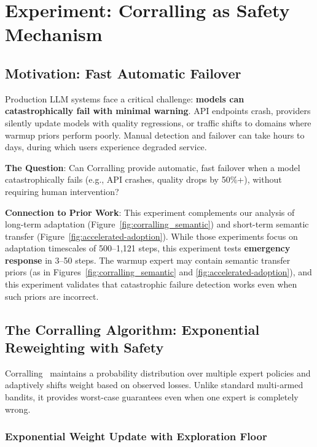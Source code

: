 
\section{Experiment: Corralling as Safety Mechanism}
\label{sec:corralling}

\subsection{Motivation: Fast Automatic Failover}

Production LLM systems face a critical challenge: \textbf{models can catastrophically fail with minimal warning}. API endpoints crash, providers silently update models with quality regressions, or traffic shifts to domains where warmup priors perform poorly. Manual detection and failover can take hours to days, during which users experience degraded service.

\textbf{The Question}: Can Corralling provide automatic, fast failover when a model catastrophically fails (e.g., API crashes, quality drops by 50\%+), without requiring human intervention?

\textbf{Connection to Prior Work}: This experiment complements our analysis of long-term adaptation (Figure~\ref{fig:corralling_semantic}) and short-term semantic transfer (Figure~\ref{fig:accelerated-adoption}). While those experiments focus on adaptation timescales of 500--1,121 steps, this experiment tests \textbf{emergency response} in 3--50 steps. The warmup expert may contain semantic transfer priors (as in Figures~\ref{fig:corralling_semantic} and \ref{fig:accelerated-adoption}), and this experiment validates that catastrophic failure detection works even when such priors are incorrect.

\subsection{The Corralling Algorithm: Exponential Reweighting with Safety}

Corralling~\cite{agarwal2017corralling} maintains a probability distribution over multiple expert policies and adaptively shifts weight based on observed losses. Unlike standard multi-armed bandits, it provides worst-case guarantees even when one expert is completely wrong.

\subsubsection{Exponential Weight Update with Exploration Floor}

